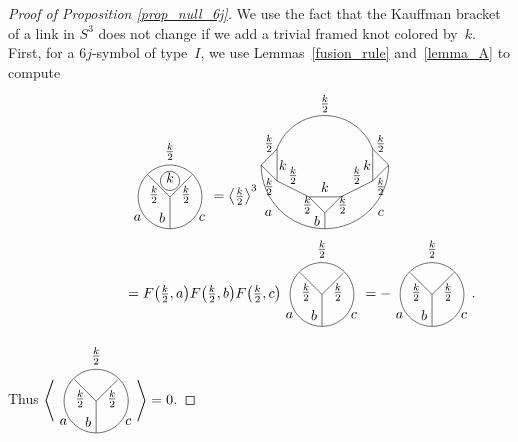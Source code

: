 \documentclass[pdftex]{sigma}
\numberwithin{equation}{section}
\begin{document}
\begin{proof}[Proof of Proposition \ref{prop_null_6j}] We use the fact that the Kauffman bracket of a link in $S^3$ does not change if we add a trivial framed knot colored by~$k$. First, for a $6j$-symbol of type~$I$, we use Lemmas~\ref{fusion_rule} and~\ref{lemma_A} to compute
\begin{gather*}
\tikz[scale=0.4,baseline=-0.5ex]{
\draw (0,0) circle (2);
\draw (0,1) circle (0.6);
\draw (0,0)--(0,-2);
\draw (-1.35,1.35)--(0,0);
\draw (1.35,1.35)--(0,0);
\draw (0,2) node[above]{$\frac{k}{2}$};
\draw (-1,1) node[below]{$\frac{k}{2}$};
\draw (1,1) node[below]{$\frac{k}{2}$};
\draw (-1.5,-1.3) node[left]{$a$};
\draw (0,-1.3) node[left]{$b$};
\draw (1.5,-1.3) node[right]{$c$};
\draw (0,0.6) node[above]{$k$};
} =
 \left< \tfrac{k}{2}\right> ^3
\tikz[scale=0.4,baseline=-0.5ex]{
\draw (-1,0)--(1,0);
\draw (-1,0)--(0,-1);
\draw (1,0)--(0,-1);
\draw (-1,0)--(-3,1);
\draw (-3,1)--(-3,3);
\draw (-3,1)--(-4,2);
\draw (-4,2)--(-3,3);
\draw (1,0)--(3,1);
\draw (3,1)--(3,3);
\draw (3,1)--(4,2);
\draw (4,2)--(3,3);
\draw (0,-1)--(0,-2);
\draw (-4,2) arc (-180:0:4);
\draw (3,3) arc (20:160:3.2);
\draw (0, -1.5) node[left]{$b$};
\draw (-3,-1) node[left]{$a$};
\draw (3,-1) node[right]{$c$};
\draw (-0.5,-0.5) node[left]{$\frac{k}{2}$};
\draw (0.5,-0.5) node[right]{$\frac{k}{2}$};
\draw (0,0) node[above]{$k$};
\draw (-2,0.5) node[above]{$\frac{k}{2}$};
\draw (2,0.5) node[above]{$\frac{k}{2}$};
\draw (-3.5, 1.5) node[below]{$\frac{k}{2}$};
\draw (3.5, 1.5) node[below]{$\frac{k}{2}$};
\draw (-3.2,2) node[right]{$k$};
\draw (3.2,2) node[left]{$k$};
\draw (3.5,2.5)node[above]{$\frac{k}{2}$};
\draw (-3.5,2.5)node[above]{$\frac{k}{2}$};
\draw (0,5) node[above]{$\frac{k}{2}$};
} \\
\hphantom{\tikz[scale=0.4,baseline=-0.5ex]{
\draw (0,0) circle (2);
\draw (0,1) circle (0.6);
\draw (0,0)--(0,-2);
\draw (-1.35,1.35)--(0,0);
\draw (1.35,1.35)--(0,0);
\draw (0,2) node[above]{$\frac{k}{2}$};
\draw (-1,1) node[below]{$\frac{k}{2}$};
\draw (1,1) node[below]{$\frac{k}{2}$};
\draw (-1.5,-1.3) node[left]{$a$};
\draw (0,-1.3) node[left]{$b$};
\draw (1.5,-1.3) node[right]{$c$};
\draw (0,0.6) node[above]{$k$};
}}{}
=
F \big(\tfrac{k}{2}, a \big)F\big(\tfrac{k}{2}, b \big)F\big(\tfrac{k}{2}, c \big) \Tetahedrongraph{$\frac{k}{2}$}{$\frac{k}{2}$}{$\frac{k}{2}$}{$a$}{$b$}{$c$}
= -\Tetahedrongraph{$\frac{k}{2}$}{$\frac{k}{2}$}{$\frac{k}{2}$}{$a$}{$b$}{$c$}.
\end{gather*}

Thus $\left< \Tetahedrongraph{$\frac{k}{2}$}{$\frac{k}{2}$}{$\frac{k}{2}$}{$a$}{$b$}{$c$} \right> =0$.


\end{proof}
\end{document}
